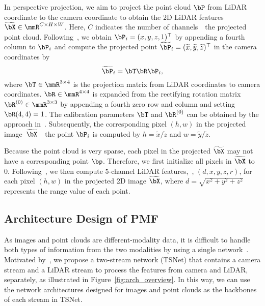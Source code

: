 \documentclass[10pt,twocolumn,letterpaper]{article}
\newcommand{\ice}[1]{{\color{black}#1}}
\begin{document}
In perspective projection, we aim to project the point cloud $\bP$ from LiDAR coordinate to the camera coordinate to obtain the 2D LiDAR features $\widetilde{\bX}\in \mmR^{C\times H \times W}$. Here, $C$ indicates the number of channels~\wrt~the projected point cloud. Following~\cite{geiger2013vision}, we obtain $\bP_i=(x, y, z, 1)^\top$ by appending a fourth column to $\bP_i$ and compute the projected point $\widetilde{\bP}_i=(\widetilde{x},\widetilde{y}, \widetilde{z})^\top$ in the camera coordinates by
\begin{equation}
\label{eq:mapping_trans}
    \widetilde{\bP}_i = \bT \bR \bP_i,
\end{equation}
where $\bT\in \mmR^{3\times 4} $ is the projection matrix from LiDAR coordinates to camera coordinates. $\bR \in \mmR^{4\times 4}$ is expanded from the rectifying rotation matrix $\bR^{(0)}\in \mmR^{3\times 3}$ by appending a fourth zero row and column and setting $\bR(4, 4)=1$. The calibration parameters $\bT$ and $\bR^{(0)}$ can be obtained by the approach in~\cite{geiger2012toolbox}. Subsequently, the corresponding pixel $(h, w)$ in the projected image~$\widetilde{\bX}$~\wrt~the point $\bP_i$ is computed by $h=\widetilde{x} / \widetilde{z}$ and $w=\widetilde{y} / \widetilde{z}$.


Because the point cloud is very sparse, each pixel in the projected $\widetilde{\bX}$ may not have a corresponding point $\bp$. Therefore, we first initialize all pixels in $\widetilde{\bX}$ to 0. Following~\cite{cortinhal2020salsanext}, we then compute 5-channel LiDAR features,~\ie, $(d, x, y, z, r)$, for each pixel $(h, w)$ in the projected 2D image $\widetilde{\bX}$, where $d=\sqrt{x^2+y^2+z^2}$ represents the range value of each point.


\subsection{Architecture Design of PMF}
\label{sec:arch}

\ice{As images and point clouds are different-modality data, it is difficult to handle both types of information from the two modalities by using a single network~\cite{krispel2020fuseseg}.} 
Motivated by~\cite{feichtenhofer2016convolutional,simonyan2014two}, we propose a two-stream network (TSNet) that contains a camera stream and a LiDAR stream to process the features from camera and LiDAR, separately, as illustrated in Figure~\ref{fig:arch_overview}. In this way, we can use the network architectures designed for images and point clouds as the backbones of each stream in TSNet. 
\end{document}
